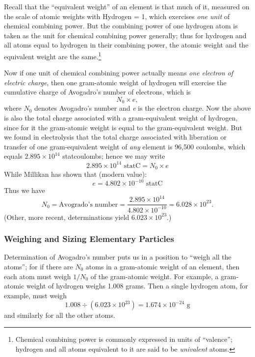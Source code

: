 Recall that the ``equivalent weight'' of an element is that much of it,
measured on the scale of atomic weights with Hydrogen = 1, which
exercises \emph{one unit} of chemical combining power. But the combining
power of one hydrogen atom is taken as the unit for chemical combining
power generally; thus for hydrogen and all atoms equal to hydrogen in
their combining power, the atomic weight and the equivalent weight are
the same.\footnote{Chemical combining power is commonly expressed in
  units of ``valence''; hydrogen and all atoms equivalent to it are said
  to be \emph{univalent} atoms.}

Now if one unit of chemical combining power actually means \emph{one
electron of electric charge}, then one gram-atomic weight of hydrogen
will exercise the cumulative charge of Avogadro's number of electrons,
which is
%
\begin{equation*}
N_0\!\times\!e,
\end{equation*}
%
where $N_0$ denotes Avogadro's number and \emph{e} is the electron
charge. Now the above is also the total charge associated with a
gram-equivalent weight of hydrogen, since for it the gram-atomic weight
is equal to the gram-equivalent weight. But we found in electrolysis
that the total charge associated with liberation or transfer of one
gram-equivalent weight of \emph{any} element is 96,500 coulombs, which
equals $2.895 \times 10^{14}$ stat\-cou\-lombs; hence we may write
%
\begin{equation*}
2.895 \times 10^{14} \text{ statC} = N_0\!\times\!e
\end{equation*}
%
While Millikan has shown that (modern value):
\begin{equation*}
e = 4.802\!\times\!10^{-10} \text{ statC}
\end{equation*}
Thus we have
\begin{equation*}
N_0 = \text{Avogrado's number} = \frac{2.895\!\times\!10^{14}}{4.802\!\times\!10^{-10}} = 6.028\!\times\!10^{23}.
\end{equation*}
(Other, more recent, determinations yield $6.023\!\times\!10^{23}$.)

\subsubsection*{Weighing and Sizing Elementary Particles}

Determination of Avogadro's number puts us in a position to ``weigh all
the atoms''; for if there are $N_0$ atoms in a gram-atomic weight of
an element, then each atom must weigh $1/N_0$ of the gram-atomic
weight. For example, a gram-atomic weight of hydrogen weighs 1.008
grams. Then a single hydrogen atom, for example, must weigh
\begin{equation*}
1.008 \div (6.023\!\times\!10^{23}) = 1.674\!\times\!10^{-24} \text{ g}
\end{equation*}
and similarly for all the other atoms.

